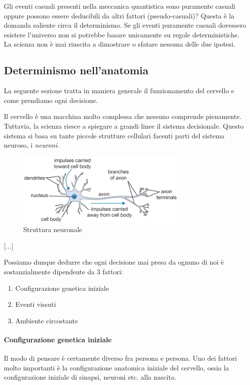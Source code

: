 \documentclass[a4paper, 12pt]{article}
\begin{document}
Gli eventi casuali presenti nella meccanica quantistica sono puramente casuali
oppure possono essere deducibili da altri fattori (pseudo-casuali)?
Questa è la domanda saliente circa il determinismo.
Se gli eventi puramente casuali dovessero esistere l'universo non si potrebbe basare unicamente
su regole deterministiche.
La scienza non è mai riuscita a dimostrare o sfatare nessuna delle due ipotesi.

\subsection{Determinismo nell'anatomia}

La seguente sezione tratta in maniera generale il funzionamento del cervello
e come prendiamo ogni decisione.

Il cervello è una macchina molto complessa che nessuno
comprende pienamente. Tuttavia, la scienza riesce a spiegare a grandi linee
il sistema decisionale. Questo sistema si basa su tante piccole strutture cellulari
facenti parti del sistema neuroso, i \textit{neuroni}.

\begin{figure}[h]
    \centering
    \includegraphics[width=0.75\textwidth]{neuron.png}
    \caption{Struttura neuronale}
\end{figure}

[...]

Possiamo dunque dedurre che ogni decisione mai presa da ognuno di noi è
sostanzialmente dipendente da 3 fattori:
\begin{enumerate}
    \item Configurazione genetica iniziale
    \item Eventi vissuti
    \item Ambiente circostante
\end{enumerate}

\paragraph{Configurazione genetica iniziale}
Il modo di pensare è certamente diverso fra persona e persona.
Uno dei fattori molto importanti è la configurazione anatomica iniziale del cervello,
ossia la configurazione iniziale di sinapsi, neuroni etc. alla nascita.
\end{document}
